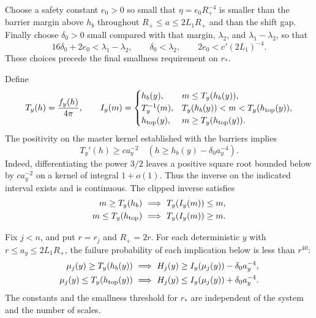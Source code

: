 Choose a safety constant $e_0>0$ so small that
$\eta=e_0R_+^{-4}$ is smaller than the barrier margin above $h_b$
throughout $R_+\le a\le2L_1R_+$ and than the shift gap. Finally choose
$\delta_0>0$ small compared with that margin, $\lambda_2$, and
$\lambda_1-\lambda_2$, so that
\begin{equation}\label{m:eq:cond-shift-order}
 16\delta_0+2e_0<\lambda_1-\lambda_2,\qquad
 \delta_0<\lambda_2,\qquad 2e_0<c'(2L_1)^{-4}.
\end{equation}
These choices precede the final smallness requirement on $r_*$.

Define
\[
 T_y(h)=\frac{f_y(h)}{4\pi},\qquad
 I_y(m)=\begin{cases}
 h_b(y),&m\le T_y(h_b(y)),\\
 T_y^{-1}(m),&T_y(h_b(y))<m<T_y(h_{\rm top}(y)),\\
 h_{\rm top}(y),&m\ge T_y(h_{\rm top}(y)).
 \end{cases}
\]
The positivity on the master kernel established with the barriers
implies
\begin{equation}\label{m:eq:cond-inverse-derivative}
 T_y'(h)\ge ca_y^{-2}
       \quad(h\ge h_b(y)-\delta_0a_y^{-4}).
\end{equation}
Indeed, differentiating the power $3/2$ leaves a positive square root
bounded below by $ca_y^{-2}$ on a kernel of integral $1+o(1)$.
Thus the inverse on the indicated interval exists and is continuous.
The clipped inverse satisfies
\begin{equation}\label{m:eq:cond-clipping}
 \begin{aligned}
 m\ge T_y(h_b)&\ \Longrightarrow\ T_y(I_y(m))\le m,\\
 m\le T_y(h_{\rm top})&\ \Longrightarrow\ T_y(I_y(m))\ge m.
 \end{aligned}
\end{equation}

\begin{lemma}\label{m:lem:cond-inverse}
Fix $j<n$, and put $r=r_j$ and $R_+=2r$. For each deterministic $y$ with $r\le a_y\le2L_1R_+$, the failure
probability of each implication below is less than $r^{40}$:
\begin{equation}\label{m:eq:cond-inverse}
 \begin{aligned}
 \mu_j(y)\ge T_y(h_b(y))
   &\ \Longrightarrow\ H_j(y)\ge I_y(\mu_j(y))-\delta_0a_y^{-4},\\
 \mu_j(y)\le T_y(h_{\rm top}(y))
   &\ \Longrightarrow\ H_j(y)\le I_y(\mu_j(y))+\delta_0a_y^{-4}.
 \end{aligned}
\end{equation}
The constants and the smallness threshold for $r_*$ are independent
of the system and the number of scales.
\end{lemma}


